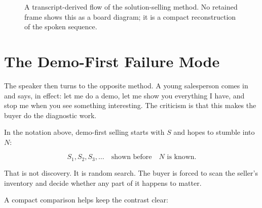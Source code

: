 \begin{figure}
\centering
{}
\caption{A transcript-derived flow of the solution-selling method. No retained frame shows this as a board diagram; it is a compact reconstruction of the spoken sequence.}
\end{figure}

\section{The Demo-First Failure Mode}

The speaker then turns to the opposite method. A young salesperson comes in and says, in effect: let me do a demo, let me show you everything I have, and stop me when you see something interesting. The criticism is that this makes the buyer do the diagnostic work.

In the notation above, demo-first selling starts with \(S\) and hopes to stumble into \(N\):

\begin{equation}
S_1,S_2,S_3,\ldots
\quad \text{shown before} \quad
N \text{ is known}.
\end{equation}

That is not discovery. It is random search. The buyer is forced to scan the seller's inventory and decide whether any part of it happens to matter.

A compact comparison helps keep the contrast clear:

